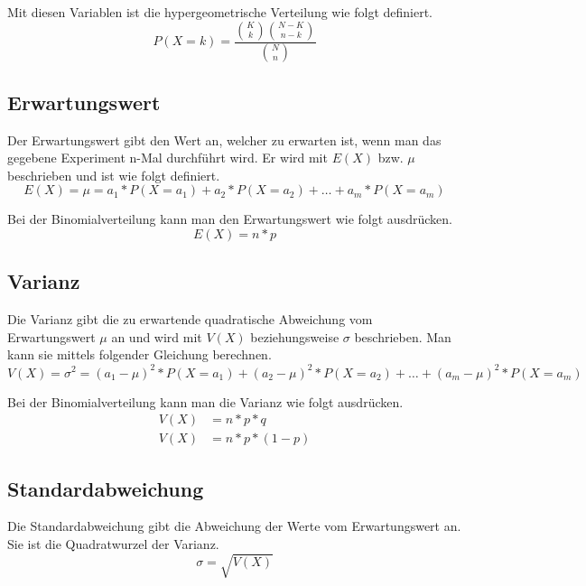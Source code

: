 \documentclass[a4paper]{article}
\begin{document}
				\noindent
				Mit diesen Variablen ist die hypergeometrische Verteilung wie folgt definiert.
				\begin{equation}
					P\left(X = k\right) = \frac{
						\binom{K}{k}
						\binom{N-K}{n-k}
					}{
						\binom{N}{n}
					}
				\end{equation}
			
		\subsection{Erwartungswert}
			Der Erwartungswert gibt den Wert an, welcher zu erwarten ist, wenn man das gegebene Experiment n-Mal durchführt wird. Er wird mit $E\left(X\right)$ bzw. $\mu$ beschrieben und ist wie folgt definiert.
			\begin{equation}
				E(X) = \mu = a_1 * P(X = a_1) + a_2 * P(X = a_2) + \dotsc + a_m * P(X = a_m)
			\end{equation}
			
			\noindent
			Bei der Binomialverteilung kann man den Erwartungswert wie folgt ausdrücken.
			\begin{equation}
				E(X) = n * p
			\end{equation}
		\subsection{Varianz}
			Die Varianz gibt die zu erwartende quadratische Abweichung vom Erwartungswert $\mu$ an und wird mit $V\left(X\right)$ beziehungsweise $\sigma$ beschrieben. Man kann sie mittels folgender Gleichung berechnen.
			\begin{equation}
				V(X) = \sigma^2 = (a_1 - \mu)^2 * P(X = a_1) + (a_2 - \mu)^2 * P(X = a_2) + \dotsc + (a_m - \mu)^2 * P(X = a_m)
			\end{equation}
			
			\noindent
			Bei der Binomialverteilung kann man die Varianz wie folgt ausdrücken.
			\begin{equation}
				\begin{split}
					V(X) &= n * p * q\\
					V(X) &= n * p * (1-p)
				\end{split}
			\end{equation}
		\subsection{Standardabweichung}
			Die Standardabweichung gibt die Abweichung der Werte vom Erwartungswert an. Sie ist die Quadratwurzel der Varianz.
			\begin{equation}
				\sigma = \sqrt{V(X)}
			\end{equation}
\end{document}
